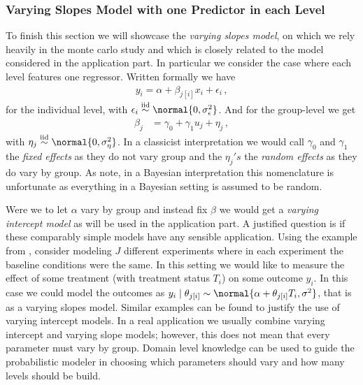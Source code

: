 \subsubsection*{Varying Slopes Model with one Predictor in each Level}
To finish this section we will showcase the \emph{varying slopes model}, on which we rely heavily in the monte carlo study and which is closely related to the model considered in the application part.
In particular we consider the case where each level features one regressor.
Written formally we have
\begin{align}
  y_i = \alpha + \beta_{j[i]} x_i + \epsilon_i \,,
\end{align}
for the individual level, with $\epsilon_i \overset{\text{iid}}{\sim} \normal{0, \sigma_\epsilon^2}$.
And for the group-level we get
\begin{align}
  \beta_j &= \gamma_0 + \gamma_1 u_j + \eta_j \,,
\end{align}
with $\eta_j \overset{\text{iid}}{\sim} \normal{0, \sigma_\eta^2}$.
In a classicist interpretation we would call $\gamma_0$ and  $\gamma_1$ the \emph{fixed effects} as they do not vary group and the $\eta_j's$ the \emph{random effects} as they do vary by group.
As \citet{GelmanHill2007} note, in a Bayesian interpretation this nomenclature is unfortunate as everything in a Bayesian setting is assumed to be random.

Were we to let $\alpha$ vary by group and instead fix $\beta$ we would get a \emph{varying intercept model} as will be used in the application part.
A justified question is if these comparably simple models have any sensible application.
Using the example from \citet{GelmanHill2007}, consider modeling $J$ different experiments where in each experiment the baseline conditions were the same.
In this setting we would like to measure the effect of some treatment (with treatment status $T_i$) on some outcome $y_i$.
In this case we could model the outcomes as $y_i \mid \theta_{j[i]} \sim \normal{\alpha + \theta_{j[i]} T_i, \sigma^2}$,
that is as a varying slopes model.
Similar examples can be found to justify the use of varying intercept models.
In a real application we usually combine varying intercept and varying slope models; however,
this does not mean that every parameter must vary by group.
Domain level knowledge can be used to guide the probabilistic modeler in choosing which parameters should vary and how many levels should be build.

